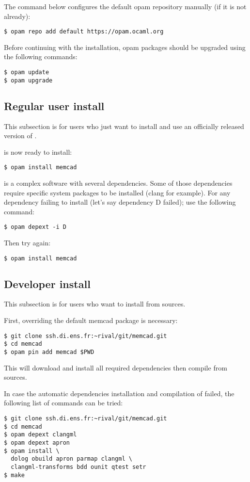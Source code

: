 The command below configures the default opam repository manually
(if it is not already):
\begin{verbatim}
$ opam repo add default https://opam.ocaml.org
\end{verbatim}

Before continuing with the installation, opam packages should be upgraded
using the following commands:
\begin{verbatim}
$ opam update
$ opam upgrade
\end{verbatim}

\subsection{Regular user install}
This subsection is for users who just want to install and use
an officially released version of \memcad.

\memcad is now ready to install:
\begin{verbatim}
$ opam install memcad
\end{verbatim}

\memcad is a complex software with several dependencies.
Some of those dependencies require specific system packages
to be installed (clang for example).
For any \memcad dependency failing to install (let's say dependency D
failed); use the following command:
\begin{verbatim}
$ opam depext -i D
\end{verbatim}

Then try again:
\begin{verbatim}
$ opam install memcad
\end{verbatim}

\subsection{Developer install}
This subsection is for users who want to install \memcad from sources.

First, overriding the default memcad package is necessary:
\begin{verbatim}
$ git clone ssh.di.ens.fr:~rival/git/memcad.git
$ cd memcad
$ opam pin add memcad $PWD
\end{verbatim}
This will download and install all required dependencies
then compile \memcad from sources.

In case the automatic dependencies installation and compilation of \memcad
failed, the following list of commands can be tried:
\begin{verbatim}
$ git clone ssh.di.ens.fr:~rival/git/memcad.git
$ cd memcad
$ opam depext clangml
$ opam depext apron
$ opam install \
  dolog obuild apron parmap clangml \
  clangml-transforms bdd ounit qtest setr
$ make
\end{verbatim}

